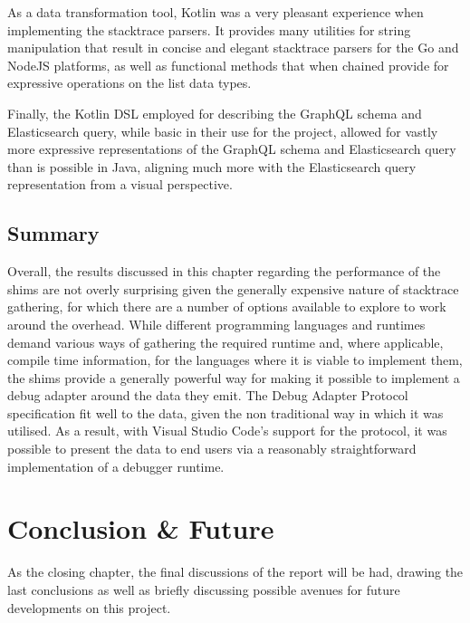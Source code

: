 \documentclass[12pt,pdftex,titlepage]{report}
\begin{document}
            As a data transformation tool, Kotlin was a very pleasant experience when implementing the stacktrace parsers. It provides many utilities for string manipulation that result in concise and elegant stacktrace parsers
            for the Go and NodeJS platforms, as well as functional methods that when chained provide for expressive operations on the list data types.

            Finally, the Kotlin DSL employed for describing the GraphQL schema and Elasticsearch query, while basic in their use for the project, allowed for vastly more expressive representations of the GraphQL schema and Elasticsearch
            query than is possible in Java, aligning much more with the Elasticsearch query representation from a visual perspective.

        \section{Summary}
            Overall, the results discussed in this chapter regarding the performance of the shims are not overly surprising given the generally expensive nature of stacktrace gathering, for which there are a number of options available 
            to explore to work around the overhead. While different programming languages and runtimes demand various ways of gathering the required runtime and, where applicable, compile time information, for the languages where it is viable to 
            implement them, the shims provide a generally powerful way for making it possible to implement a debug adapter around the data they emit. The Debug Adapter Protocol specification fit well to the data, given the non traditional 
            way in which it was utilised. As a result, with Visual Studio Code's support for the protocol, it was possible to present the data to end users via a reasonably straightforward implementation of a debugger runtime.

    \chapter{Conclusion \& Future}
        As the closing chapter, the final discussions of the report will be had, drawing the last conclusions as well as briefly discussing possible avenues for future developments on this project.
\end{document}
